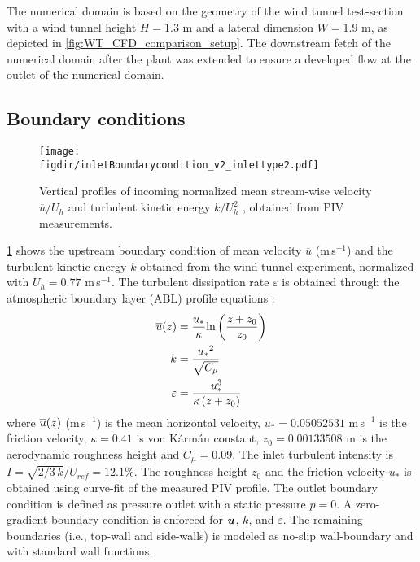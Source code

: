 The numerical domain is based on the geometry of the wind tunnel test-section with a wind tunnel height $H=1.3$ m and a lateral dimension $W=1.9$ m, as depicted in \cref{fig:WT_CFD_comparison_setup}. The downstream fetch of the numerical domain after the plant was extended to ensure a developed flow at the outlet of the numerical domain. %

\subsection{Boundary conditions}

\begin{figure}[t]
	\centering
	\texttt{[image: \\figdir/inletBoundarycondition\_v2\_inlettype2.pdf]}
	\caption{Vertical profiles of incoming normalized  mean stream-wise velocity $\overline{u}/U_h$ and   turbulent kinetic energy $k/U_h^2$ , obtained from PIV measurements.}
	\label{fig:boundaryprofile}
\end{figure}

\cref{fig:boundaryprofile} shows the upstream boundary condition of mean velocity $\overline{u}$ (m\,s$^{-1}$) and the turbulent kinetic energy $k$ obtained from the wind tunnel experiment, normalized with $U_h = 0.77$ m\,s$^{-1}$. The turbulent dissipation rate $\varepsilon$ is obtained through the atmospheric boundary layer (ABL) profile equations \citep{Richards1993}:
\begin{align}
	\overline{u}(z) &= \frac{{{u_*}}}{\kappa }{\text{ln}}\left( {\frac{{z + {z_0}}}{{{z_0}}}} \right) \\
	k &= \frac{{{u_*}^2}}{{\sqrt {{C_\mu }} }} \\
	\varepsilon  &= \frac{{u_*^3}}{{\kappa \left( {z + {z_0}} \right)}}
	\label{eq:ableq}
\end{align}
where $\overline{u}(z)$ (m\,s$^{-1}$) is the mean horizontal velocity, $u_*= \num{0.05052531}$ m\,s$^{-1}$ is  the friction velocity, $\kappa=0.41$ is von K\'arm\'an constant, $z_0 = \num{0.00133508}$ m is the aerodynamic roughness height and $C_{\mu}=0.09$. The inlet turbulent intensity is $I = \sqrt{2/3\,k}/U_{ref} = 12.1 \%$. The roughness height $z_0$ and the friction velocity $u_*$ is obtained using curve-fit of the measured PIV profile. The outlet boundary condition is defined as pressure outlet with a static pressure $p=0$. A zero-gradient boundary condition is enforced for $\textbf{\textit{u}}$, $k$, and $\varepsilon$. The remaining boundaries (i.e., top-wall and side-walls) is modeled as no-slip wall-boundary and with standard wall functions.

